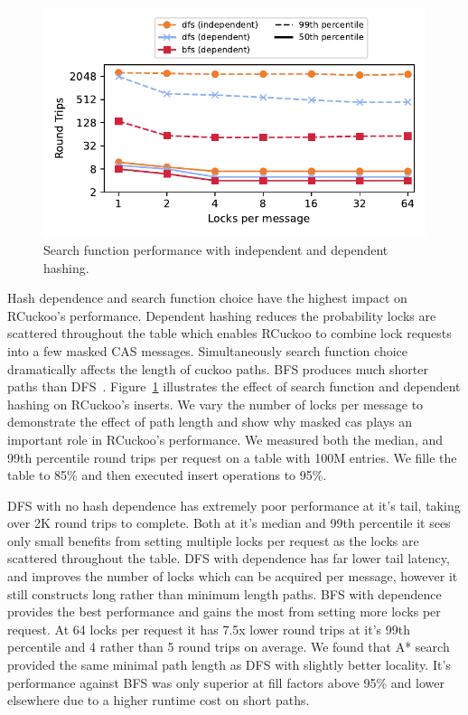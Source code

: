 \begin{figure}[ht]
    \includegraphics[width=0.99\linewidth]{fig/search_dependence.pdf}

    \caption{ Search function performance with independent
    and dependent hashing.}

    \label{fig:search_dependence}
\end{figure}

Hash dependence and search function choice have the highest
impact on RCuckoo's performance. Dependent hashing reduces
the probability locks are scattered throughout the table
which enables RCuckoo to combine lock requests into a few
masked CAS messages. Simultaneously search function choice
dramatically affects the length of cuckoo paths. BFS
produces much shorter paths than
DFS~\cite{cuckoo-improvements,pilaf,cuckoo}.
Figure~\ref{fig:search_dependence} illustrates the effect of
search function and dependent hashing on RCuckoo's inserts.
We vary the number of locks per message to demonstrate the
effect of path length and show why masked cas plays an
important role in RCuckoo's performance. We measured both
the median, and 99th percentile round trips per request on a
table with 100M entries. We fille the table to 85\% and then
executed insert operations to 95\%.

DFS with no hash dependence has extremely poor performance
at it's tail, taking over 2K round trips to complete. Both
at it's median and 99th percentile it sees only small
benefits from setting multiple locks per request as the
locks are scattered throughout the table. DFS with
dependence has far lower tail latency, and improves the
number of locks which can be acquired per message, however
it still constructs long rather than minimum length paths.
BFS with dependence provides the best performance and gains
the most from setting more locks per request. At 64 locks
per request it has 7.5x lower round trips at it's 99th
percentile and 4 rather than 5 round trips on average. We
found that A* search provided the same minimal path length
as DFS with slightly better locality. It's performance
against BFS was only superior at fill factors above 95\% and
lower elsewhere due to a higher runtime cost on short paths.



